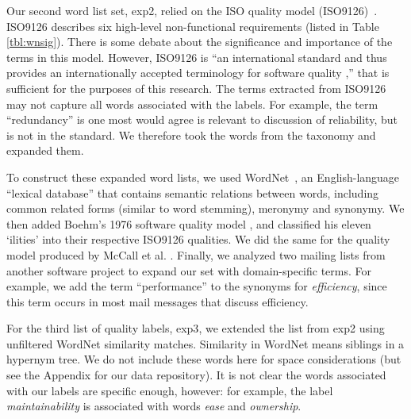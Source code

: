 \documentclass[]{sig-alternate}
\begin{document}
Our second word list set, \textsf{exp2}, relied on the ISO quality model (ISO9126)~\cite{iso9126}. ISO9126 describes six high-level non-functional requirements (listed in Table \ref{tbl:wnsig}). There is some debate about the significance and importance of the terms in this model. However, ISO9126 is ``an international standard and thus provides an internationally accepted terminology for software quality \cite[p. 58]{Boegh2008},'' that is sufficient for the purposes of this research. The terms extracted from ISO9126 may not capture all words associated with the labels.  For example, the term ``redundancy'' is one most would agree is relevant to discussion of reliability, but is not in the standard. We therefore took the words from the taxonomy and expanded them.

To construct these expanded word lists, we used WordNet~\cite{Fellbaum1998}, an English-language ``lexical database'' that contains semantic relations between words, including common related forms (similar to word stemming), meronymy and synonymy. We then added Boehm's 1976 software quality model \cite{Boehm+:1976:ICSE}, and classified his eleven `ilities' into their respective ISO9126 qualities. We did the same for the quality model produced by McCall et al. \cite{mccall1977}. Finally, we analyzed two mailing lists from another software project to expand our set with domain-specific terms. For example, we add the term ``performance'' to the synonyms for \emph{efficiency}, since this term occurs in most mail messages that discuss efficiency.

For the third list of quality labels,  \textsf{exp3}, we extended the list from \textsf{exp2} using unfiltered WordNet similarity matches. Similarity in WordNet means siblings in a hypernym tree. We do not include these words here for space considerations (but see the Appendix for our data repository). It is not clear the words associated with our labels are specific enough, however: for example, the label \emph{maintainability} is associated with words \emph{ease} and \emph{ownership}.
\end{document}
